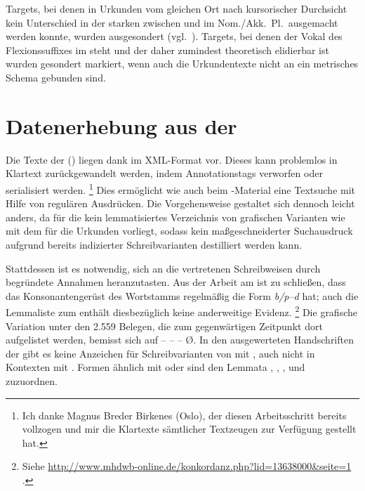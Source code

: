 Targets, bei denen in Urkunden vom gleichen Ort nach kursorischer
Durchsicht kein Unterschied in der starken  zwischen
 und  im Nom./Akk.~Pl.\ ausgemacht werden konnte, wurden
ausgesondert (vgl.~). Targets, bei denen der Vokal des
Flexionssuffixes im  steht und der daher zumindest theoretisch
elidierbar ist \autocites[vgl.][90--91]{askedal1973}[191]{gjelsten1980} wurden
gesondert markiert, wenn auch die Urkundentexte nicht an ein metrisches Schema
gebunden sind.


\section{Datenerhebung aus der }
\label{sec:miningkc}

Die Texte der  (\KC) liegen dank 
\autocite{kcdigital} im XML-Format vor. Dieses kann problemlos in Klartext
zurückgewandelt werden, indem Annotationstags verworfen oder
serialisiert werden.%
%
	\footnote{Ich danke Magnus Breder Birkenes (Oslo), der diesen
	Arbeitsschritt bereits vollzogen und mir die Klartexte sämtlicher
	Textzeugen zur Verfügung gestellt hat.}
%
Dies ermöglicht wie auch beim \CAO{}-Material eine Textsuche mit Hilfe von
regulären Ausdrücken. Die Vorgehensweise gestaltet sich
dennoch leicht anders, da für die \KC{} kein lemmatisiertes Verzeichnis von
grafischen Varianten wie mit dem \WMU{} für die Urkunden vorliegt,
sodass kein maßgeschneiderter Suchausdruck aufgrund bereits indizierter
Schreibvarianten destilliert werden kann.

Stattdessen ist es notwendig, sich an die vertretenen Schreibweisen durch
begründete Annahmen heranzutasten. Aus der Arbeit am \CAO{} ist zu schließen,
dass das Konsonantengerüst des Wortstamms regelmäßig die Form \textit{b/p--d}
hat; auch die Lemmaliste zum 
\autocite[s.\,v.~]{mwb1} enthält diesbezüglich keine anderweitige
Evidenz.%
%
	\footnote{Siehe
		\url{http://www.mhdwb-online.de/konkordanz.php?lid=13638000&seite=1}%
		.}
%
Die grafische Variation unter den 2.559 Belegen, die zum gegenwärtigen
Zeitpunkt dort aufgelistet werden, bemisst sich auf  --  --  --  Ø. In den ausgewerteten Handschriften der \KC{} gibt
es keine Anzeichen für Schreibvarianten von   mit
, auch nicht in Kontexten mit . Formen ähnlich
 mit  oder  sind den Lemmata 
,  , 
,   und
  zuzuordnen.

